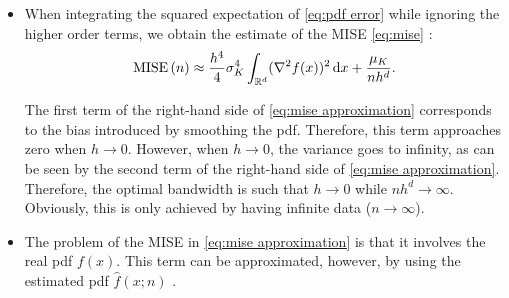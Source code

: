 \documentclass[10pt,final,a4paper,oneside,onecolumn]{article}
\newlength{\figurewidth}
\newlength{\figureheight}
\newcommand{\mise}[1]{\textup{MISE} \left( #1 \right)}
\begin{document}
\begin{itemize}
\begin{itemize}
%		
%			

		\item When integrating the squared expectation of \cref{eq:pdf error} while ignoring the higher order terms, we obtain the estimate of the MISE \cref{eq:mise} \cite{chen2017tutorial}:
		\begin{equation} \label{eq:mise approximation}
		\mise{n} \approx \frac{h^4}{4} \sigma_K^4 \int_{\mathbb{R}^d} (\nabla^2 f(x))^2 \, \textup{d}x + \frac{\mu_K}{nh^d}.
		\end{equation}
		
		The first term of the right-hand side of \cref{eq:mise approximation} corresponds to the bias introduced by smoothing the pdf. Therefore, this term approaches zero when $h \rightarrow 0$. However, when $h \rightarrow 0$, the variance goes to infinity, as can be seen by the second term of the right-hand side of \cref{eq:mise approximation}. Therefore, the optimal bandwidth is such that $h \rightarrow 0$ while $nh^d \rightarrow \infty$. Obviously, this is only achieved by having infinite data ($n \rightarrow \infty$).
		
		\item The problem of the MISE in \cref{eq:mise approximation} is that it involves the real pdf $f(x)$. This term can be approximated, however, by using the estimated pdf $\hat{f}(x;n)$ \cite{calonico2018effect}. 
		

\end{itemize}
\end{itemize}
\end{document}
